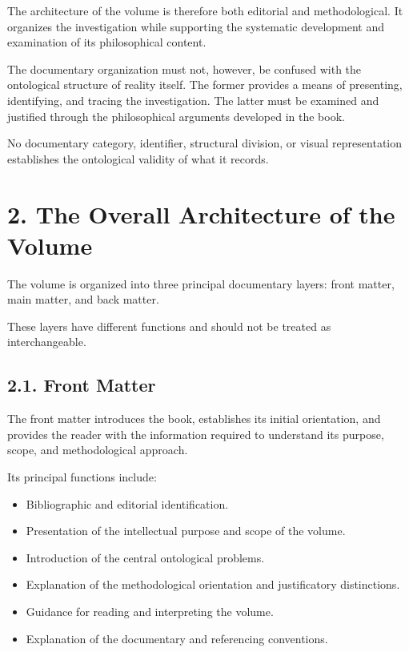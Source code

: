 The architecture of the volume is therefore both
editorial and methodological. It organizes the
investigation while supporting the systematic
development and examination of its philosophical
content.

The documentary organization must not, however,
be confused with the ontological structure of
reality itself. The former provides a means of
presenting, identifying, and tracing the
investigation. The latter must be examined and
justified through the philosophical arguments
developed in the book.

No documentary category, identifier, structural
division, or visual representation establishes
the ontological validity of what it records.


\section*{2. The Overall Architecture of the Volume}

The volume is organized into three principal
documentary layers: front matter, main matter,
and back matter.

These layers have different functions and should
not be treated as interchangeable.

\subsection*{2.1. Front Matter}

The front matter introduces the book, establishes
its initial orientation, and provides the reader
with the information required to understand
its purpose, scope, and methodological approach.

Its principal functions include:

\begin{itemize}
    \item Bibliographic and editorial identification.
    \item Presentation of the intellectual purpose
    and scope of the volume.
    \item Introduction of the central ontological
    problems.
    \item Explanation of the methodological orientation
    and justificatory distinctions.
    \item Guidance for reading and interpreting the volume.
    \item Explanation of the documentary and referencing
    conventions.
\end{itemize}

